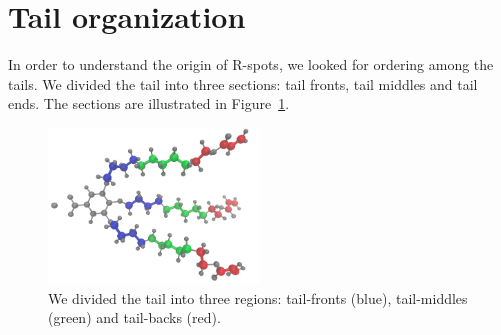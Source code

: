 \documentclass{article}
\begin{document}



  \section{Tail organization}
  
  In order to understand the origin of R-spots, we looked for ordering among
  the tails. We divided the tail into three sections: tail fronts, tail 
  middles and tail ends. The sections are illustrated in 
  Figure~\ref{fig:tail_sections}.
  
  \begin{figure}[!htb]
  \centering
  \includegraphics[width=0.5\textwidth]{tail_sections.png}
  \caption{We divided the tail into three regions: tail-fronts (blue), 
  tail-middles (green) and tail-backs (red).}\label{fig:tail_sections}
  \end{figure}
  
\end{document}
